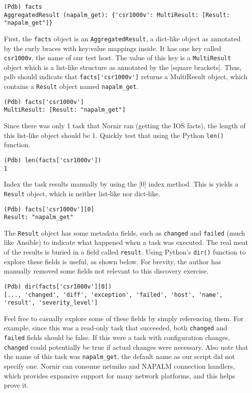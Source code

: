 \begin{verbatim}
(Pdb) facts
AggregatedResult (napalm_get): {'csr1000v': MultiResult: [Result: "napalm_get"]}
\end{verbatim}

First, the \verb|facts| object is an \verb|AggregatedResult|, a dict-like
object as annotated by the {curly braces} with key:value mappings inside. It
has one key called \verb|csr1000v|, the name of our test host. The value of
this key is a \verb|MultiResult| object which is a list-like structure as
annotated by the [square brackets]. Thus, pdb should indicate that
\verb|facts['csr1000v']| returns a MultiResult object, which contains a
\verb|Result| object named \verb|napalm_get|.

\begin{verbatim}
(Pdb) facts['csr1000v']
MultiResult: [Result: "napalm_get"]
\end{verbatim}

Since there was only 1 task that Nornir ran (getting the IOS facts), the
length of this list-like object should be 1. Quickly test that using the
Python \verb|len()| function.

\begin{verbatim}
(Pdb) len(facts['csr1000v'])
1
\end{verbatim}

Index the task results manually by using the [0] index method. This is yields
a \verb|Result| object, which is neither list-like nor dict-like.

\begin{verbatim}
(Pdb) facts['csr1000v'][0]
Result: "napalm_get"
\end{verbatim}

The \verb|Result| object has some metadata fields, such as \verb|changed| and
\verb|failed| (much like Ansible) to indicate what happened when a task was
executed. The real meat of the results is buried in a field called
\verb|result|. Using Python's \verb|dir()| function to explore these fields is
useful, as shown below. For brevity, the author has manually removed some
fields not relevant to this discovery exercise.

\begin{verbatim}
(Pdb) dir(facts['csr1000v'][0])
[..., 'changed', 'diff', 'exception', 'failed', 'host', 'name', 'result', 'severity_level']
\end{verbatim}

Feel free to casually explore some of these fields by simply referencing them.
For example, since this was a read-only task that succeeded, both
\verb|changed| and \verb|failed| fields should be false. If this were a task
with configuration changes, \verb|changed| could potentially be true if actual
changes were necessary. Also note that the name of this task was
\verb|napalm_get|, the default name as our script did not specify one. Nornir
can consume netmiko and NAPALM connection handlers, which provides expansive
support for many network platforms, and this helps prove it.

